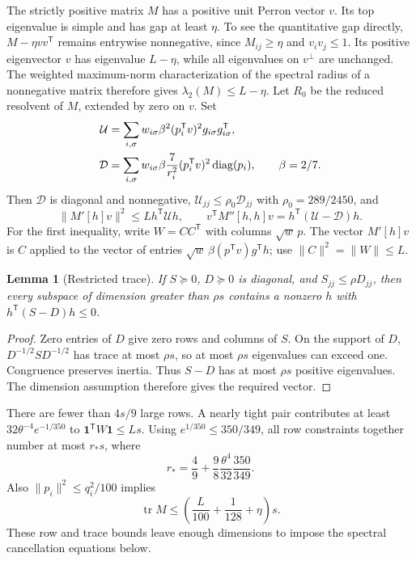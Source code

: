 \documentclass[11pt]{amsart}
\newtheorem{lemma}[theorem]{Lemma}
\theoremstyle{definition}\newtheorem{definition}[theorem]{Definition}
\theoremstyle{remark}\newtheorem{remark}[theorem]{Remark}
\numberwithin{equation}{section}
\newcommand{\diag}{\operatorname{diag}}
\newcommand{\tr}{\operatorname{tr}}
\newcommand{\one}{\mathbf1}
\newcommand{\T}{\mathsf T}
\begin{document}
The strictly positive matrix $M$ has a positive unit Perron vector $v$.
Its top eigenvalue is simple and has gap at least $\eta$. To see the
quantitative gap directly, $M-\eta vv^\T$ remains entrywise nonnegative,
since $M_{ij}\ge\eta$ and $v_iv_j\le1$. Its positive eigenvector $v$ has
eigenvalue $L-\eta$, while all eigenvalues on $v^\perp$ are unchanged.
The weighted maximum-norm characterization of the spectral radius of a
nonnegative matrix therefore gives $\lambda_2(M)\le L-\eta$.
Let $R_0$ be the reduced resolvent of $M$, extended by zero on $v$. Set
\begin{align}\label{b:eq:UD}
 \mathcal U&=\sum_{i,\sigma}w_{i\sigma}\beta^2(p_i^\T v)^2
                    g_{i\sigma}g_{i\sigma}^\T,\notag\\
 \mathcal D&=\sum_{i,\sigma}w_{i\sigma}\beta\frac7{r_i^2}
                    (p_i^\T v)^2\diag(p_i),\qquad\beta=2/7.
\end{align}
Then $\mathcal D$ is diagonal and nonnegative,
$\mathcal U_{jj}\le\rho_0\mathcal D_{jj}$ with
$\rho_0=289/2450$, and
\begin{equation}\label{b:eq:gram}
 \|M'[h]v\|^2\le Lh^\T\mathcal U h,\qquad
 v^\T M''[h,h]v=h^\T(\mathcal U-\mathcal D)h.
\end{equation}
For the first inequality, write $W=CC^\T$ with columns $\sqrt w\,p$.
The vector $M'[h]v$ is $C$ applied to the vector of entries
$\sqrt w\,\beta(p^\T v)g^\T h$; use $\|C\|^2=\|W\|\le L$.

\begin{lemma}[Restricted trace]\label{b:lem:trace}
If $S\succeq0$, $D\succeq0$ is diagonal, and $S_{jj}\le\rho D_{jj}$,
then every subspace of dimension greater than $\rho s$ contains a nonzero
$h$ with $h^\T(S-D)h\le0$.
\end{lemma}
\begin{proof}
Zero entries of $D$ give zero rows and columns of $S$. On the support of $D$,
$D^{-1/2}SD^{-1/2}$ has trace at most $\rho s$, so at most $\rho s$
eigenvalues can exceed one. Congruence preserves inertia. Thus $S-D$ has
at most $\rho s$ positive eigenvalues. The dimension assumption therefore gives the required vector.
\end{proof}

There are fewer than $4s/9$ large rows. A nearly tight pair contributes at least
$32\theta^{-4}e^{-1/350}$ to $\one^\T W\one\le Ls$.
Using $e^{1/350}\le350/349$, all row constraints together number at most $r_*s$,
where
\begin{equation}\label{b:eq:rowcount}
 r_*=\frac49+\frac98\frac{\theta^4}{32}\frac{350}{349}.
\end{equation}
Also $\|p_i\|^2\le q_i^2/100$ implies
\begin{equation}\label{b:eq:traceM}
 \tr M\le\left(\frac L{100}+\frac1{128}+\eta\right)s.
\end{equation}
These row and trace bounds leave enough dimensions to impose the
spectral cancellation equations below.
\end{document}
